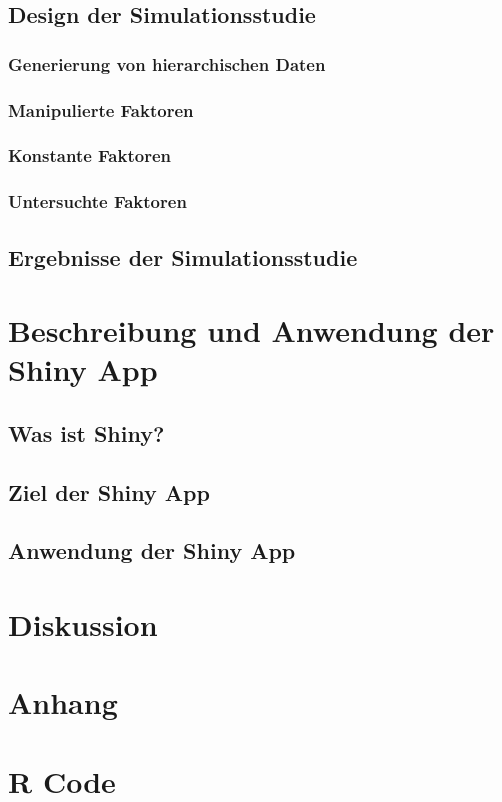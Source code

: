\documentclass[12pt]{article}\usepackage[]{graphicx}\usepackage[]{color}
\numberwithin{equation}{section}
\begin{document}
\subsection{Design der Simulationsstudie}
\subsubsection{Generierung von hierarchischen Daten} \label{section:generierung_daten}
\subsubsection{Manipulierte Faktoren}
\subsubsection{Konstante Faktoren}
\subsubsection{Untersuchte Faktoren}
\subsection{Ergebnisse der Simulationsstudie}

\section{Beschreibung und Anwendung der Shiny App}
\subsection{Was ist Shiny?}
\subsection{Ziel der Shiny App}
\subsection{Anwendung der Shiny App}

\section{Diskussion}
\newpage



\section{Anhang}
\appendix
\section{R Code}
\end{document}
